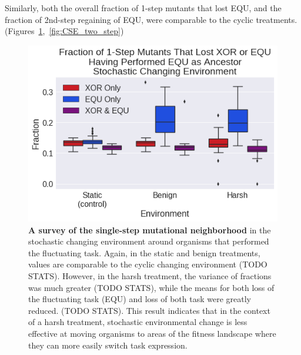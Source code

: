 \documentclass[letterpaper]{article}
\begin{document}
Similarly, both the overall fraction of 1-step mutants that lost EQU, and the fraction of 2nd-step regaining of EQU, were comparable to the cyclic treatments. 
(Figures~\ref{fig:CSE_single_step},~\ref{fig:CSE_two_step})

\begin{figure}[h!] %
\begin{center}
\includegraphics[trim={0.2cm 0 0 0.2cm},clip,width=1\columnwidth]{figures/CSE_frac_1step__filtered__box.png}
\caption{\textbf{A survey of the single-step mutational neighborhood} in the stochastic changing environment around organisms that performed the fluctuating task. Again, in the static and benign treatments, values are comparable to the cyclic changing environment (TODO STATS). However, in the harsh treatment, the variance of fractions was much greater (TODO STATS), while the means for both loss of the fluctuating task (EQU) and loss of both task were greatly reduced. (TODO STATS). This result indicates that in the context of a harsh treatment, stochastic environmental change is less effective at moving organisms to areas of the fitness landscape where they can more easily switch task expression. %
}\label{fig:CSE_single_step}
\end{center}
\end{figure}
\end{document}
